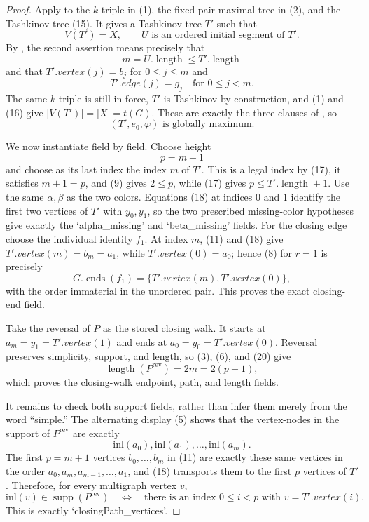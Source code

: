 \begin{proof}
Apply  to the $k$-triple in (1),
the fixed-pair maximal tree in (2), and the Tashkinov tree (15).  It gives
a Tashkinov tree $T'$ such that
\[
 V(T')=X,\qquad U\text{ is an ordered initial segment of }T'.    \tag{16}
\]
By , the second assertion means
precisely that
\[
 m=U.\operatorname{length}\leq T'.\operatorname{length}          \tag{17}
\]
and that $T'.vertex(j)=b_j$ for $0\leq j\leq m$ and
\[
 T'.edge(j)=g_j\quad\text{for }0\leq j<m.                        \tag{18}
\]
The same $k$-triple is still in force, $T'$ is Tashkinov by construction,
and (1) and (16) give $|V(T')|=|X|=t(G)$.  These are exactly the three
clauses of , so
\[
                   (T',e_0,\varphi)\text{ is globally maximum}.  \tag{19}
\]

We now instantiate  field by field.
Choose height
\[
                    p=m+1                                      \tag{20}
\]
and choose as its last index the index $m$ of $T'$.  This is a legal index
by (17), it satisfies $m+1=p$, and (9) gives $2\leq p$, while (17) gives
$p\leq T'.\operatorname{length}+1$.  Use the same $\alpha,\beta$ as the
two colors.  Equations (18) at indices $0$ and $1$ identify the first two
vertices of $T'$ with $y_0,y_1$, so the two prescribed missing-color
hypotheses give exactly the `alpha_missing' and `beta_missing' fields.
For the closing edge choose the individual identity $f_1$.  At index $m$,
(11) and (18) give $T'.vertex(m)=b_m=a_1$, while
$T'.vertex(0)=a_0$; hence (8) for $r=1$ is precisely
\[
 G.\operatorname{ends}(f_1)
    =\{T'.vertex(m),T'.vertex(0)\},                               \tag{21}
\]
with the order immaterial in the unordered pair.  This proves the exact
closing-end field.

Take the reversal of $P$ as the stored closing walk.  It starts at
$a_m=y_1=T'.vertex(1)$ and ends at
$a_0=y_0=T'.vertex(0)$.  Reversal preserves simplicity, support, and
length, so (3), (6), and (20) give
\[
 \operatorname{length}(P^{\mathrm{rev}})=2m=2(p-1),              \tag{22}
\]
which proves the closing-walk endpoint, path, and length fields.

It remains to check both support fields, rather than infer them merely
from the word ``simple.''  The alternating display (5) shows that the
vertex-nodes in the support of $P^{\mathrm{rev}}$ are exactly
\[
 \mathrm{inl}(a_0),\mathrm{inl}(a_1),\ldots,
 \mathrm{inl}(a_m).                                               \tag{23}
\]
The first $p=m+1$ vertices $b_0,\ldots,b_m$ in (11) are exactly these
same vertices in the order
$a_0,a_m,a_{m-1},\ldots,a_1$, and (18) transports them to the first
$p$ vertices of $T'$.  Therefore, for every multigraph vertex $v$,
\[
 \mathrm{inl}(v)\in\operatorname{supp}(P^{\mathrm{rev}})
 \quad\Longleftrightarrow\quad
 \text{there is an index }0\leq i<p\text{ with }v=T'.vertex(i).  \tag{24}
\]
This is exactly `closingPath_vertices'.


\end{proof}
